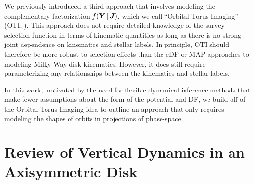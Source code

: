 We previously introduced a third approach that involves modeling the complementary
factorization $f(\boldsymbol{Y} \,|\, \boldsymbol{J})$, which we call ``Orbital Torus Imaging'' (OTI;
\citealt{PW:2021}).
This approach does not require detailed knowledge of the survey selection function in
terms of kinematic quantities as long as there is no strong joint dependence on
kinematics and stellar labels.
In principle, OTI should therefore be more robust to selection effects than the eDF or
MAP approaches to modeling Milky Way disk kinematics.
However, it does still require parameterizing any relationships between the kinematics
and stellar labels.

In this work, motivated by the need for flexible dynamical inference methods that make
fewer assumptions about the form of the potential and DF, we build off of the Orbital
Torus Imaging idea to outline an approach that only requires modeling the shapes of
orbits in projections of phase-space.


\section{Review of Vertical Dynamics in an Axisymmetric Disk} \label{sec:dynreview}


